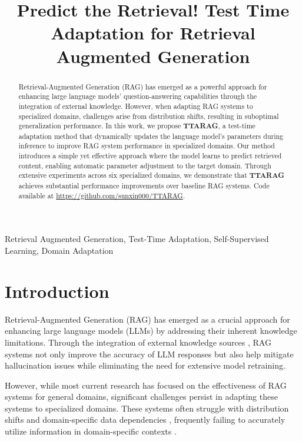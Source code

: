 \documentclass{article}
\title{Predict the Retrieval! Test Time Adaptation for Retrieval Augmented Generation}
\newcommand{\ourmethod}{{\fontfamily{lmtt}\selectfont \textbf{TTARAG}}\xspace}
\begin{document}
\ninept
%
\maketitle
%
\begin{abstract}
Retrieval-Augmented Generation (RAG) has emerged as a powerful approach for enhancing large language models' question-answering capabilities through the integration of external knowledge. However, when adapting RAG systems to specialized domains, challenges arise from distribution shifts, resulting in suboptimal generalization performance. In this work, we propose \ourmethod, a test-time adaptation method that dynamically updates the language model's parameters during inference to improve RAG system performance in specialized domains. Our method introduces a simple yet effective approach where the model learns to predict retrieved content, enabling automatic parameter adjustment to the target domain. Through extensive experiments across six specialized domains, we demonstrate that \ourmethod achieves substantial performance improvements over baseline RAG systems. Code available at \url{https://github.com/sunxin000/TTARAG}.
\end{abstract}
%
\begin{keywords}
Retrieval Augmented Generation, Test-Time Adaptation, Self-Supervised Learning, Domain Adaptation
\end{keywords}
%
\section{Introduction}
Retrieval-Augmented Generation (RAG) \cite{izacard2021leveraging, lewis2020retrieval, edge2024local} has emerged as a crucial approach for enhancing large language models (LLMs) \cite{radford2019language, brown2020language, bubeck2023sparks} by addressing their inherent knowledge limitations. Through the integration of external knowledge sources \cite{pasca-2019-wikipedia, bollacker2008freebase, jin2019pubmedqa}, RAG systems not only improve the accuracy of LLM responses but also help mitigate hallucination issues while eliminating the need for extensive model retraining.

However, while most current research has focused on the effectiveness of RAG systems for general domains, significant challenges persist in adapting these systems to specialized domains. These systems often struggle with distribution shifts and domain-specific data dependencies \cite{xu2025simragselfimprovingretrievalaugmentedgeneration, shi2024medadapter}, frequently failing to accurately utilize information in domain-specific contexts \cite{miller2020effect, liu-etal-2022-challenges}. 
\end{document}
